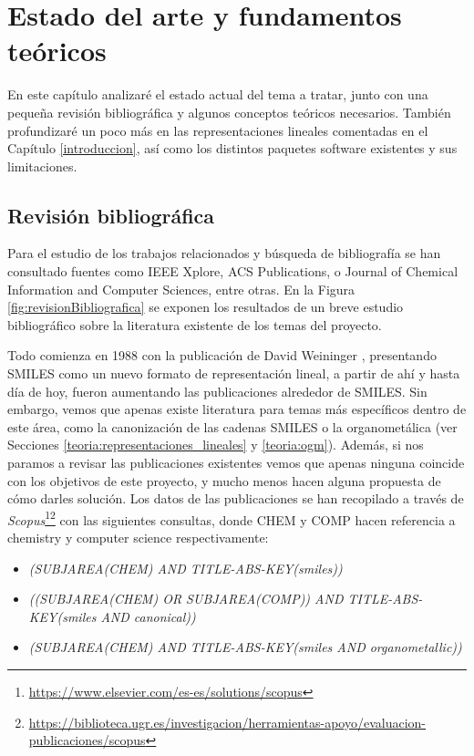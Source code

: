 
\chapter{Estado del arte y fundamentos teóricos}\label{estadoArte}

En este capítulo analizaré el estado actual del tema a tratar, junto con una pequeña revisión bibliográfica y algunos conceptos teóricos necesarios. También profundizaré un poco más en las representaciones lineales comentadas en el Capítulo \ref{introduccion}, así como los distintos paquetes software existentes y sus limitaciones. 

\section{Revisión bibliográfica} \label{revision_bib}
Para el estudio de los trabajos relacionados y búsqueda de bibliografía se han consultado fuentes como IEEE Xplore, ACS Publications, o Journal of Chemical Information and Computer Sciences, entre otras. En la Figura \ref{fig:revisionBibliografica} se exponen los resultados de un breve estudio bibliográfico sobre la literatura existente de los temas del proyecto. 

Todo comienza en 1988 con la publicación de David Weininger \cite{weininger_smiles_1988}, presentando SMILES como un nuevo formato de representación lineal, a partir de ahí y hasta día de hoy, fueron aumentando las publicaciones alrededor de SMILES. Sin embargo, vemos que apenas existe literatura para temas más específicos dentro de este área, como la canonización de las cadenas SMILES o la organometálica (ver Secciones \ref{teoria:representaciones_lineales} y \ref{teoria:ogm}). Además, si nos paramos a revisar las publicaciones existentes vemos que apenas ninguna coincide con los objetivos de este proyecto, y mucho menos hacen alguna propuesta de cómo darles solución. Los datos de las publicaciones se han recopilado a través de \textit{Scopus}\footnote{\url{https://www.elsevier.com/es-es/solutions/scopus}}\footnotecomma\footnote{\url{https://biblioteca.ugr.es/investigacion/herramientas-apoyo/evaluacion-publicaciones/scopus}} con las siguientes consultas, donde CHEM y COMP hacen referencia a chemistry y computer science respectivamente: 
\begin{itemize}
    \item {\footnotesize \textit{(SUBJAREA(CHEM) AND TITLE-ABS-KEY(smiles))}} 
    \item {\footnotesize \textit{((SUBJAREA(CHEM) OR SUBJAREA(COMP)) AND TITLE-ABS-KEY(smiles AND canonical))}}
    \item {\footnotesize \textit{(SUBJAREA(CHEM) AND TITLE-ABS-KEY(smiles AND organometallic))}}
\end{itemize}

